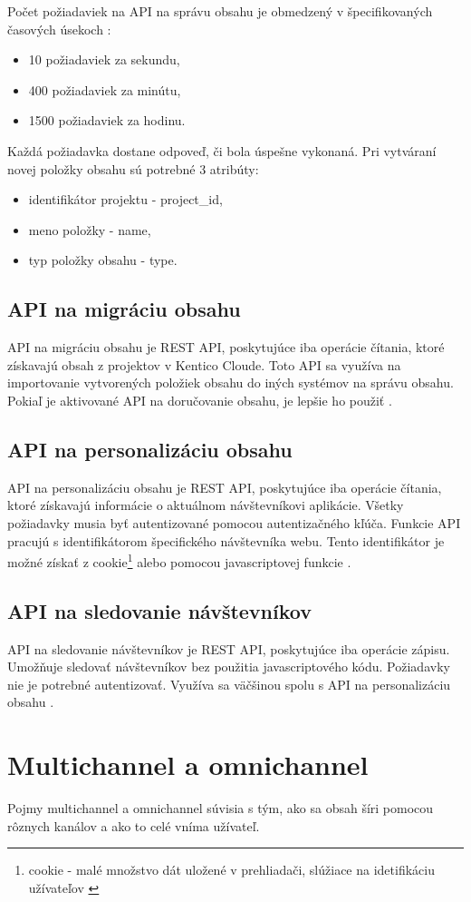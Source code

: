 \documentclass[
  printed, %
  table,   %
  lof,     %
  nolot,     %
  twoside,  
]{fithesis3}
\begin{document}
Počet požiadaviek na API na správu obsahu je obmedzený v špecifikovaných časových úsekoch \cite{contentM}: 
 \begin{itemize}
	\item 10 požiadaviek za sekundu,
	\item 400 požiadaviek za minútu,
	\item 1500 požiadaviek za hodinu.
\end{itemize}
Každá požiadavka dostane odpoveď, či bola úspešne vykonaná. Pri vytváraní novej položky obsahu sú potrebné 3 atribúty: 
\begin{itemize}
	\item identifikátor projektu - project\_id,
	\item meno položky - name,
	\item typ položky obsahu - type.
\end{itemize}
\subsection{API na migráciu obsahu}
API na migráciu obsahu je REST API, poskytujúce iba operácie čítania, ktoré získavajú obsah z projektov v Kentico Cloude. Toto API sa využíva na importovanie vytvorených položiek obsahu do iných systémov na správu obsahu. Pokiaľ je aktivované API na doručovanie obsahu, je lepšie ho použiť \cite{migra}.
\subsection{API na personalizáciu obsahu}
API na personalizáciu obsahu je REST API, poskytujúce iba operácie čítania, ktoré získavajú informácie o aktuálnom návštevníkovi aplikácie. Všetky požiadavky musia byť autentizované pomocou autentizačného kľúča.
Funkcie API pracujú s identifikátorom špecifického návštevníka webu. Tento identifikátor je možné získať z cookie\footnote{cookie - malé množstvo dát uložené v prehliadači, slúžiace na idetifikáciu užívateľov \cite{cookie}} alebo pomocou javascriptovej funkcie \cite{pers}.
\subsection{API na sledovanie návštevníkov}
API na sledovanie návštevníkov je REST API, poskytujúce iba operácie zápisu. Umožňuje sledovať návštevníkov bez použitia javascriptového kódu. Požiadavky nie je potrebné autentizovať. Využíva sa väčšinou spolu s API na personalizáciu obsahu \cite{track}.

\section{Multichannel a omnichannel}
Pojmy multichannel a omnichannel súvisia s tým, ako sa obsah šíri pomocou rôznych kanálov a ako to celé vníma užívateľ.
\end{document}
